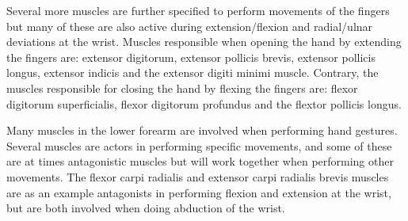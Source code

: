 Several more muscles are further specified to perform movements of the fingers but many of these are also active during extension/flexion and radial/ulnar deviations at the wrist. Muscles responsible when opening the hand by extending the fingers are: extensor digitorum, extensor pollicis brevis, extensor pollicis longus, extensor indicis and the extensor digiti minimi muscle. Contrary, the muscles responsible for closing the hand by flexing the fingers are: flexor digitorum superficialis, flexor digitorum profundus and the flextor pollicis longus. \cite{Martini2012}







%
%
%
%


Many muscles in the lower forearm are involved when performing hand gestures. Several muscles are actors in performing specific movements, and some of these are at times antagonistic muscles but will work together when performing other movements. The flexor carpi radialis and extensor carpi radialis brevis muscles are as an example antagonists in performing flexion and extension at the wrist, but are both involved when doing abduction of the wrist. \cite{Martini2012} 

